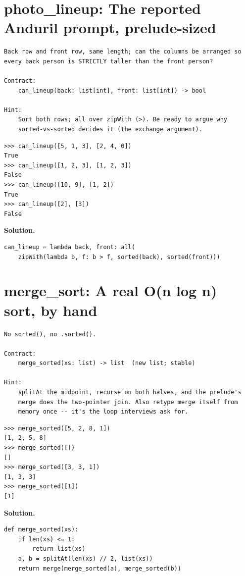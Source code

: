 \documentclass[10pt,letterpaper]{book}
\begin{document}
\section{photo\_lineup: The reported Anduril prompt, prelude-sized}
\begin{lstlisting}[style=ex]
Back row and front row, same length; can the columns be arranged so
every back person is STRICTLY taller than the front person?

Contract:
    can_lineup(back: list[int], front: list[int]) -> bool

Hint:
    Sort both rows; all over zipWith (>). Be ready to argue why
    sorted-vs-sorted decides it (the exchange argument).
\end{lstlisting}
\begin{lstlisting}[style=ex]
>>> can_lineup([5, 1, 3], [2, 4, 0])
True
>>> can_lineup([1, 2, 3], [1, 2, 3])
False
>>> can_lineup([10, 9], [1, 2])
True
>>> can_lineup([2], [3])
False
\end{lstlisting}
\noindent\textbf{Solution.}
\begin{lstlisting}[style=code]
can_lineup = lambda back, front: all(
    zipWith(lambda b, f: b > f, sorted(back), sorted(front)))
\end{lstlisting}

\section{merge\_sort: A real O(n log n) sort, by hand}
\begin{lstlisting}[style=ex]
No sorted(), no .sorted().

Contract:
    merge_sorted(xs: list) -> list  (new list; stable)

Hint:
    splitAt the midpoint, recurse on both halves, and the prelude's
    merge does the two-pointer join. Also retype merge itself from
    memory once -- it's the loop interviews ask for.
\end{lstlisting}
\begin{lstlisting}[style=ex]
>>> merge_sorted([5, 2, 8, 1])
[1, 2, 5, 8]
>>> merge_sorted([])
[]
>>> merge_sorted([3, 3, 1])
[1, 3, 3]
>>> merge_sorted([1])
[1]
\end{lstlisting}
\noindent\textbf{Solution.}
\begin{lstlisting}[style=code]
def merge_sorted(xs):
    if len(xs) <= 1:
        return list(xs)
    a, b = splitAt(len(xs) // 2, list(xs))
    return merge(merge_sorted(a), merge_sorted(b))
\end{lstlisting}
\end{document}
